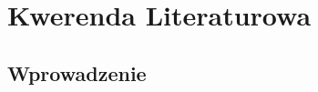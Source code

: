 \documentclass[12pt]{article}
\title{}
\author{Maciej Pawłowski \and Mateusz Woźniak}
\date{22 grudnia 2023}
\begin{document}
\maketitle

\section{Kwerenda Literaturowa}
\subsection{Wprowadzenie}
\end{document}
